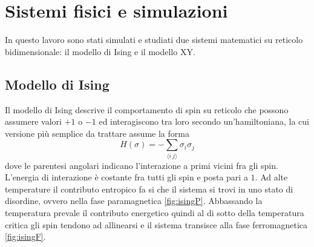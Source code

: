 \documentclass{article}
\begin{document}
\section{Sistemi fisici e simulazioni}
In questo lavoro sono stati simulati e studiati due sistemi matematici su reticolo bidimensionale:  il modello di Ising e il modello XY.
\subsection{Modello di Ising}
Il modello di Ising descrive il comportamento di spin su reticolo che possono assumere valori $+1$ o $-1$ ed interagiscono tra loro secondo un'hamiltoniana, la cui versione più semplice da trattare assume la forma
\begin{equation}
H(\sigma) =- \sum_{\langle i~j\rangle} \sigma_i\sigma_j
\end{equation} 
dove le parentesi angolari indicano l'interazione a primi vicini fra gli spin. L'energia di interazione è costante fra tutti gli spin e posta pari a $1$. Ad alte temperature il contributo entropico fa si che il sistema si trovi in uno stato di disordine, ovvero nella fase paramagnetica \ref{fig:isingP}. Abbassando la temperatura prevale il contributo energetico quindi al di sotto della temperatura critica gli spin tendono ad allinearsi e il sistema transisce alla fase ferromagnetica \ref{fig:isingF}.
\end{document}
